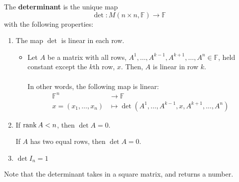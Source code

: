 \documentclass[letterpaper,12pt]{article}
\begin{document}
\begin{definition}
The \textbf{determinant} is the unique map
\begin{equation*}
    \det: M(n \times n, \mathbb{F}) \longrightarrow \mathbb{F}
\end{equation*}
with the following properties:
\begin{enumerate}
    \item The map $\det$ is linear in each row.
    \begin{itemize}
        \item Let $A$ be a matrix with all rows, $A^1, \dots, A^{k-1}, A^{k+1}, \dots, A^n \in \mathbb{F}$, held constant except the $k$th row, $x$. Then, $A$ is linear in row $k$.
        \\ \\ In other words, the following map is linear:
        \begin{align*}
            \mathbb{F}^n & \longrightarrow \mathbb{F} \\
            x = (x_1, \dots, x_n) & \longmapsto \det{(A^1, \dots, A^{k-1}, x, A^{k+1}, \dots, A^n)}
        \end{align*}
    \end{itemize}
    \item If $\operatorname{rank}{A} < n$, then $\det{A} = 0$.
    \begin{corollary}
    If $A$ has two equal rows, then $\det{A} = 0$.
    \end{corollary}
    \item $\det{I_n} = 1$
\end{enumerate}
\end{definition}
Note that the determinant takes in a square matrix, and returns a number.
\end{document}
